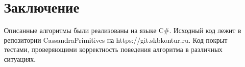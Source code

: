 \section{Заключение}

Описанные алгоритмы были реализованы на языке C\#. Исходный код лежит в репозитории CassandraPrimitives на https://git.skbkontur.ru. Код покрыт тестами, проверяющими корректность поведения алгоритма в различных ситуациях.